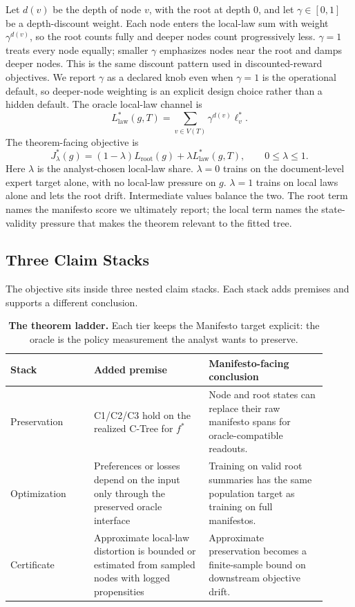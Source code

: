 Let \(d(v)\) be the depth of node \(v\), with the root at depth \(0\),
and let \(\gamma\in[0,1]\) be a depth-discount weight. Each node enters
the local-law sum with weight \(\gamma^{d(v)}\), so the root counts
fully and deeper nodes count progressively less. \(\gamma=1\) treats
every node equally; smaller \(\gamma\) emphasizes nodes near the root
and damps deeper nodes. This is the same discount pattern used in
discounted-reward objectives. We report \(\gamma\) as a declared knob
even when \(\gamma=1\) is the operational default, so deeper-node
weighting is an explicit design choice rather than a hidden default.
The oracle local-law channel is
\begin{equation}
\label{eq:v8-local-law-estimand}
  L_{\mathrm{law}}^\ast(g,T)
  =
  \sum_{v\in V(T)}\gamma^{d(v)}\ell_v^\ast .
\end{equation}
The theorem-facing objective is
\begin{equation}
\label{eq:v8-main-objective}
  J_\lambda^\ast(g)
  =
  (1-\lambda)L_{\mathrm{root}}(g)
  +
  \lambda L_{\mathrm{law}}^\ast(g,T),
  \qquad 0\le\lambda\le 1 .
\end{equation}
Here \(\lambda\) is the analyst-chosen local-law share. \(\lambda=0\)
trains on the document-level expert target alone, with no local-law
pressure on \(g\). \(\lambda=1\) trains on local laws alone and lets
the root drift. Intermediate values balance the two. The root term
names the manifesto score we ultimately report; the local term names
the state-validity pressure that makes the theorem relevant to the
fitted tree.

\subsection{Three Claim Stacks}

The objective sits inside three nested claim stacks. Each stack adds premises
and supports a different conclusion.

\begin{table}[t]
\centering
\small
\begin{tabular}{@{}p{0.24\linewidth}p{0.33\linewidth}p{0.34\linewidth}@{}}
\toprule
Stack & Added premise & Manifesto-facing conclusion \\
\midrule
Preservation & C1/C2/C3 hold on the realized C-Tree for \(f^\ast\) &
Node and root states can replace their raw manifesto spans for
oracle-compatible readouts. \\
Optimization & Preferences or losses depend on the input only through the
preserved oracle interface &
Training on valid root summaries has the same population target as training
on full manifestos. \\
Certificate & Approximate local-law distortion is bounded or estimated from
sampled nodes with logged propensities &
Approximate preservation becomes a finite-sample bound on downstream
objective drift. \\
\bottomrule
\end{tabular}
\caption{\textbf{The theorem ladder.} Each tier keeps the Manifesto target
explicit: the oracle is the policy measurement the analyst wants to preserve.}
\label{tab:v8-theorem-ladder}
\end{table}


